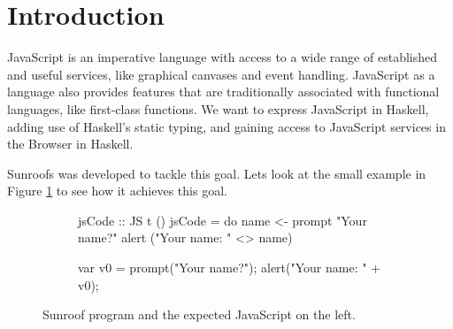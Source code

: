  
\section{Introduction}

JavaScript is an imperative language with access to a wide range
of established and useful services, like graphical canvases and event
handling. JavaScript as a language also provides features that are
traditionally associated with functional languages, like first-class 
functions. We want to express JavaScript in Haskell, adding use
of Haskell's static typing, and gaining access to JavaScript services
in the Browser in Haskell.

Sunroofs was developed to tackle this goal. 
Lets look at the small example
in Figure \ref{fig:code-example} to see how it achieves this goal.

\begin{figure}[h]
\vspace{-0.5cm}
\centering
\begin{subfigure}{0.45\textwidth}%
\begin{Code}
 jsCode :: JS t ()
 jsCode = do
   name <- prompt "Your name?"
   alert ("Your name: " <> name)
\end{Code}%
\end{subfigure}%
\hfill%
\begin{subfigure}{0.45\textwidth}
\vspace{0.25cm}%
\begin{Code}
  
  
var v0 = prompt("Your name?"); 
alert("Your name: " + v0);
\end{Code}%
\end{subfigure}%
\caption{Sunroof program and the expected JavaScript on the left.}%
\label{fig:code-example}%
\vspace{-0.5cm}
\end{figure}

